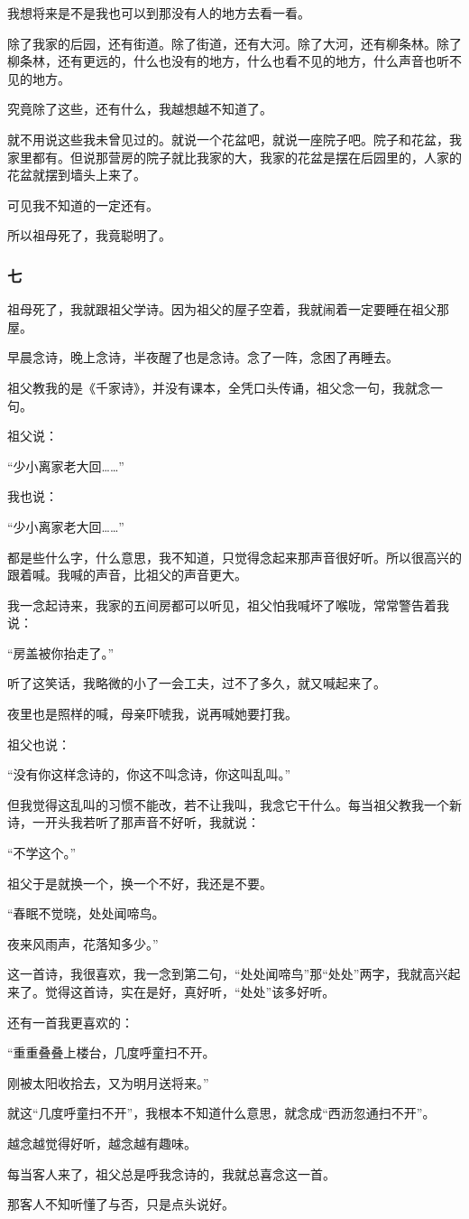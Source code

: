 \par 我想将来是不是我也可以到那没有人的地方去看一看。
\par 除了我家的后园，还有街道。除了街道，还有大河。除了大河，还有柳条林。除了柳条林，还有更远的，什么也没有的地方，什么也看不见的地方，什么声音也听不见的地方。
\par 究竟除了这些，还有什么，我越想越不知道了。
\par 就不用说这些我未曾见过的。就说一个花盆吧，就说一座院子吧。院子和花盆，我家里都有。但说那营房的院子就比我家的大，我家的花盆是摆在后园里的，人家的花盆就摆到墙头上来了。
\par 可见我不知道的一定还有。
\par 所以祖母死了，我竟聪明了。
\subsubsection*{七}
\par 祖母死了，我就跟祖父学诗。因为祖父的屋子空着，我就闹着一定要睡在祖父那屋。
\par 早晨念诗，晚上念诗，半夜醒了也是念诗。念了一阵，念困了再睡去。
\par 祖父教我的是《千家诗》，并没有课本，全凭口头传诵，祖父念一句，我就念一句。
\par 祖父说：
\par “少小离家老大回……”
\par 我也说：
\par “少小离家老大回……”
\par 都是些什么字，什么意思，我不知道，只觉得念起来那声音很好听。所以很高兴的跟着喊。我喊的声音，比祖父的声音更大。
\par 我一念起诗来，我家的五间房都可以听见，祖父怕我喊坏了喉咙，常常警告着我说：
\par “房盖被你抬走了。”
\par 听了这笑话，我略微的小了一会工夫，过不了多久，就又喊起来了。
\par 夜里也是照样的喊，母亲吓唬我，说再喊她要打我。
\par 祖父也说：
\par “没有你这样念诗的，你这不叫念诗，你这叫乱叫。”
\par 但我觉得这乱叫的习惯不能改，若不让我叫，我念它干什么。每当祖父教我一个新诗，一开头我若听了那声音不好听，我就说：
\par “不学这个。”
\par 祖父于是就换一个，换一个不好，我还是不要。
\par “春眠不觉晓，处处闻啼鸟。
\par 夜来风雨声，花落知多少。”
\par 这一首诗，我很喜欢，我一念到第二句，“处处闻啼鸟”那“处处”两字，我就高兴起来了。觉得这首诗，实在是好，真好听，“处处”该多好听。
\par 还有一首我更喜欢的：
\par “重重叠叠上楼台，几度呼童扫不开。
\par 刚被太阳收拾去，又为明月送将来。”
\par 就这“几度呼童扫不开”，我根本不知道什么意思，就念成“西沥忽通扫不开”。
\par 越念越觉得好听，越念越有趣味。
\par 每当客人来了，祖父总是呼我念诗的，我就总喜念这一首。
\par 那客人不知听懂了与否，只是点头说好。
